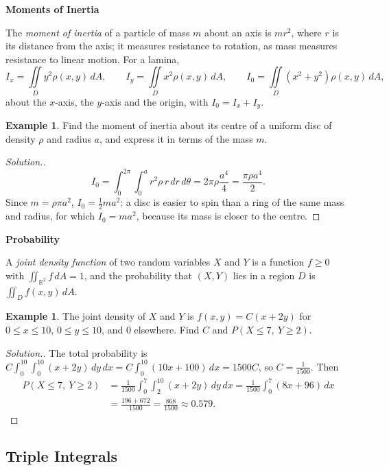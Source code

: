 \documentclass[11pt,a4paper]{article}
\theoremstyle{definition}
\newtheorem{exa}[thm]{Example}
\newenvironment{solution}
  {\renewcommand{\qedsymbol}{}\begin{proof}[\textit{Solution}.]}
  {\end{proof}}
\newcommand{\subhead}[1]{%
  \par\medskip\noindent\textbf{#1}\par\nobreak\smallskip}
\begin{document}
\subhead{Moments of Inertia}

The \emph{moment of inertia} of a particle of mass $m$ about an axis is $mr^2$,
where $r$ is its distance from the axis; it measures resistance to rotation, as
mass measures resistance to linear motion. For a lamina,
\[I_x = \iint\limits_D y^2\rho(x,y)\,dA,\qquad I_y = \iint\limits_D
x^2\rho(x,y)\,dA,\qquad I_0 = \iint\limits_D (x^2 + y^2)\rho(x,y)\,dA,\]
about the $x$-axis, the $y$-axis and the origin, with $I_0 = I_x + I_y$.

\begin{exa}
\label{ex:inertiadisc}
Find the moment of inertia about its centre of a uniform disc of density $\rho$
and radius $a$, and express it in terms of the mass $m$.
\end{exa}

\begin{solution}
\[I_0 = \int_0^{2\pi}\int_0^a r^2\rho\,r\,dr\,d\theta = 2\pi\rho\frac{a^4}{4} =
\frac{\pi\rho a^4}{2} .\]
Since $m = \rho\pi a^2$, $I_0 = \frac12 ma^2$: a disc is easier to spin than a
ring of the same mass and radius, for which $I_0 = ma^2$, because its mass is
closer to the centre.
\end{solution}

\subhead{Probability}

A \emph{joint density function} of two random variables $X$ and $Y$ is a
function $f\geq 0$ with $\iint_{\mathbb{R}^2}f\,dA = 1$, and the probability that
$(X,Y)$ lies in a region $D$ is $\iint_D f(x,y)\,dA$.

\begin{exa}
\label{ex:jointdensity}
The joint density of $X$ and $Y$ is $f(x,y) = C(x + 2y)$ for
$0\leq x\leq 10$, $0\leq y\leq 10$, and $0$ elsewhere. Find $C$ and
$P(X\leq 7,\ Y\geq 2)$.
\end{exa}

\begin{solution}
The total probability is
$C\int_0^{10}\int_0^{10}(x + 2y)\,dy\,dx = C\int_0^{10}(10x + 100)\,dx = 1500C$,
so $C = \frac{1}{1500}$. Then
\begin{align*}
P(X\leq 7,\ Y\geq 2) & = \frac{1}{1500}\int_0^7\int_2^{10}(x + 2y)\,dy\,dx =
\frac{1}{1500}\int_0^7 (8x + 96)\,dx\\
& = \frac{196 + 672}{1500} = \frac{868}{1500}\approx 0.579 .
\end{align*}
\end{solution}


{\color[wave]{485}\subsection{Triple Integrals}}
\end{document}
